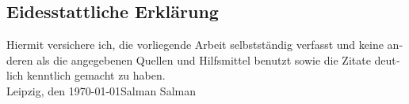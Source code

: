 \newpage
\begin{otherlanguage}{ngerman}
\thispagestyle{empty}
\section*{Eidesstattliche Erklärung}
\thispagestyle{empty}
Hiermit versichere ich, die vorliegende Arbeit selbstständig verfasst und keine anderen als die angegebenen Quellen und Hilfsmittel benutzt sowie die Zitate deutlich kenntlich gemacht zu haben.
\newline
\vspace{4\baselineskip}\\
Leipzig, den \today \hfill Salman Salman 
\vspace{4\baselineskip}\\
\end{otherlanguage}